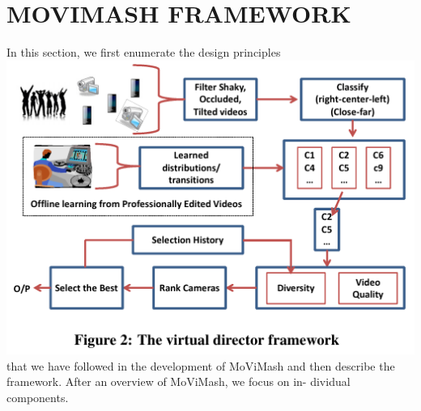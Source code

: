 \documentclass{sig-alternate}
\begin{document}
\section{MOVIMASH FRAMEWORK}
In this section, we first enumerate the design principles \includegraphics[scale=1]{two.pdf}\\
that we
have followed in the development of MoViMash and then describe
the framework. After an overview of MoViMash, we focus on in-
dividual components.
\end{document}
